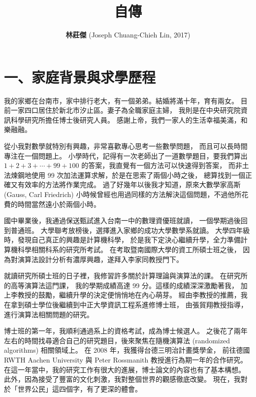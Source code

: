 \documentclass[10pt,a4paper]{article}
\begin{document}
\onehalfspacing

\title{\bf 自傳}
\author{\large {\bf 林莊傑} (Joseph Chuang-Chieh Lin, 2017)}
\date{}

\maketitle



\section*{\bf\large 一、家庭背景與求學歷程}
\label{sec:personal-information}

\setcounter{page}{1}


我的家鄉在台南市，家中排行老大，有一個弟弟。結婚將滿十年，育有兩女。
目前一家四口居住於新北市汐止區。妻子為全職家庭主婦，
我則是在中央研究院資訊科學研究所擔任博士後研究人員。
感謝上帝，我們一家人的生活幸福美滿，和樂融融。


從小我對數學就特別有興趣，非常喜歡專心思考一些數學問題，
而且可以長時間專注在一個問題上。
小學時代，記得有一次老師出了一道數學題目，要我們算出 $1+2+3+\cdots + 
99 + 100$ 的答案，我直覺有一個方法可以快速得到答案，
而非土法煉鋼地使用 99 次加法運算求解，於是在思索了兩個小時之後，
總算找到一個正確又有效率的方法將作業完成。
過了好幾年以後我才知道，原來大數學家高斯 (Gauss, Carl Friedrich) 
小時候曾經也用過同樣的方法解決這個問題，不過他所花費的時間當然遠小於兩個小時。


國中畢業後，我通過保送甄試進入台南一中的數理資優班就讀，
一個學期過後回到普通班。
大學聯考放榜後，選擇進入家鄉的成功大學數學系就讀。
大學四年級時，發現自己真正的興趣是計算機科學，
於是我下定決心繼續升學，全力準備計算機科學相關科系的研究所考試。
在考取暨南國際大學的資工所碩士班之後，
因為對演算法設計分析有濃厚興趣，遂拜入李家同教授門下。


就讀研究所碩士班的日子裡，我修習許多關於計算理論與演算法的課。
在研究所的高等演算法這門課，
我的學期成績高達 99 分。這樣的成績深深激勵著我，
加上李教授的鼓勵，繼續升學的決定便悄悄地在內心萌芽。
經由李教授的推薦，我在拿到碩士學位後繼續到中正大學資訊工程系進修博士班，
由張貿翔教授指導，進行演算法相關問題的研究。


博士班的第一年，我順利通過系上的資格考試，成為博士候選人。
之後花了兩年左右的時間找尋適合自己的研究題目，後來聚焦在隨機演算法 
(randomized algorithms) 相關領域上。
在 2008 年，我獲得台德三明治計畫獎學金，
前往德國 RWTH Aachen University 與 
Peter Rossmanith 教授進行為期一年的合作研究。
在這一年當中，我的研究工作有很大的進展，博士論文的內容也有了基本構想。
此外，因為接受了豐富的文化刺激，我對整個世界的觀感徹底改變。
現在，我對於「世界公民」這四個字，有了更深的體會。
\end{document}
